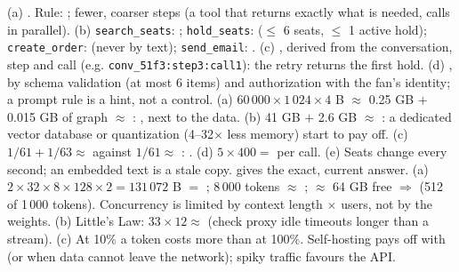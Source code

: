  (a) . Rule: ; fewer, coarser steps (a tool that returns exactly what is needed, calls in parallel). (b) \texttt{search\_seats}: ; \texttt{hold\_seats}:  ($\le$ 6 seats, $\le$ 1 active hold); \texttt{create\_order}:  (never by text); \texttt{send\_email}: . (c) , derived from the conversation, step and call (e.g. \texttt{conv\_51f3:step3:call1}): the retry returns the first hold. (d) , by schema validation (at most 6 items) and authorization with the fan's identity; a prompt rule is a hint, not a control.
 (a) $60\,000 \times 1\,024 \times 4$ B $\approx$ 0.25 GB $+$ 0.015 GB of graph $\approx$ : , next to the data. (b) 41 GB $+$ 2.6 GB $\approx$ : a dedicated vector database or quantization (4--32$\times$ less memory) start to pay off. (c) $1/61 + 1/63 \approx$  against $1/61 \approx$ : . (d) $5 \times 400 =$  per call. (e) Seats change every second; an embedded text is a stale copy.  gives the exact, current answer.
 (a) $2 \times 32 \times 8 \times 128 \times 2 = 131\,072$ B $=$ ; 8\,000 tokens $\approx$ ; $\approx$ 64 GB free $\Rightarrow$  (512 of 1\,000 tokens). Concurrency is limited by context length $\times$ users, not by the weights. (b) Little's Law: $33 \times 12 \approx$  (check proxy idle timeouts longer than a stream). (c) At 10\% a token costs  more than at 100\%. Self-hosting pays off with  (or when data cannot leave the network); spiky traffic favours the API.
